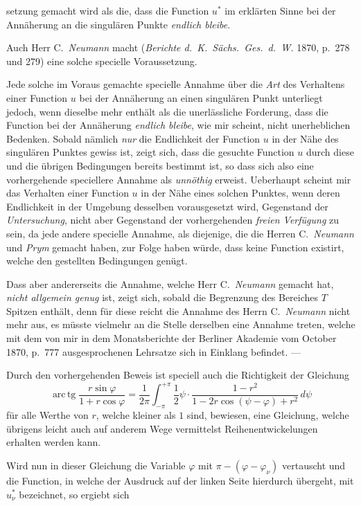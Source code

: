 \documentclass{article}
\begin{document}
setzung gemacht wird als die, dass die Function $u^*$ im erklärten Sinne bei der Annäherung an die singulären Punkte \emph{endlich bleibe}.

Auch Herr C.~\emph{Neumann} macht (\emph{Berichte d.~K.~Sächs.~Ges.~d.~W.} 1870, p.~278 und 279) eine solche specielle Voraussetzung.

Jede solche im Voraus gemachte specielle Annahme über die \emph{Art} des Verhaltens einer Function $u$ bei der Annäherung an einen singulären Punkt unterliegt jedoch, wenn dieselbe mehr enthält als die unerlässliche Forderung, dass die Function bei der Annäherung \emph{endlich bleibe}, wie mir scheint, nicht unerheblichen Bedenken. Sobald nämlich \emph{nur} die Endlichkeit der Function $u$ in der Nähe des singulären Punktes gewiss ist, zeigt sich, dass die gesuchte Function $u$ durch diese und die übrigen Bedingungen bereits bestimmt ist, so dass sich also eine vorhergehende speciellere Annahme als \emph{unnöthig} erweist. Ueberhaupt scheint mir das Verhalten einer Function $u$ in der Nähe eines solchen Punktes, wenn deren Endlichkeit in der Umgebung desselben vorausgesetzt wird, Gegenstand der \emph{Untersuchung}, nicht aber Gegenstand der vorhergehenden \emph{freien Verfügung} zu sein, da jede andere specielle Annahme, als diejenige, die die Herren C.~\emph{Neumann} und \emph{Prym} gemacht haben, zur Folge haben würde, dass keine Function existirt, welche den gestellten Bedingungen genügt.

Dass aber andererseits die Annahme, welche Herr C.~\emph{Neumann} gemacht hat, \emph{nicht allgemein genug} ist, zeigt sich, sobald die Begrenzung des Bereiches $T$ Spitzen enthält, denn für diese reicht die Annahme des Herrn C.~\emph{Neumann} nicht mehr aus, es müsste vielmehr an die Stelle derselben eine Annahme treten, welche mit dem von mir in dem Monatsberichte der Berliner Akademie vom October 1870, p.~777 ausgesprochenen Lehrsatze sich in Einklang befindet. ---

Durch den vorhergehenden Beweis ist speciell auch die Richtigkeit der Gleichung
\[
\operatorname{arc\,tg}\frac{r\sin\varphi}{1 + r\cos\varphi} = \frac{1}{2\pi} \int_{-\pi}^{+\pi} \frac{1}{2}\psi \cdot \frac{1 - r^2}{1 - 2r \cos(\psi - \varphi) + r^2}\,d\psi
\]
für alle Werthe von $r$, welche kleiner als $1$ sind, bewiesen, eine Gleichung, welche übrigens leicht auch auf anderem Wege vermittelst Reihenentwickelungen erhalten werden kann.

Wird nun in dieser Gleichung die Variable $\varphi$ mit $\pi - (\varphi - \varphi_\nu)$ vertauscht und die Function, in welche der Ausdruck auf der linken Seite hierdurch übergeht, mit $u_\nu^*$ bezeichnet, so ergiebt sich
\end{document}

